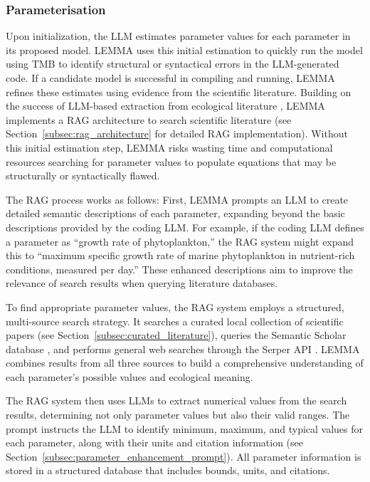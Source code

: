 \subsubsection{Parameterisation}
Upon initialization, the LLM estimates parameter values for each parameter in its proposed model. LEMMA uses this initial estimation to quickly run the model using TMB to identify structural or syntactical errors in the LLM-generated code. If a candidate model is successful in compiling and running, LEMMA refines these estimates using evidence from the scientific literature. Building on the success of LLM-based extraction from ecological literature \citep{keck2025extracting,spillias2024evaluating}, LEMMA implements a RAG architecture to search scientific literature (see Section~\ref{subsec:rag_architecture} for detailed RAG implementation). Without this initial estimation step, LEMMA risks wasting time and computational resources searching for parameter values to populate equations that may be structurally or syntactically flawed.

The RAG process works as follows: First, LEMMA prompts an LLM to create detailed semantic descriptions of each parameter, expanding beyond the basic descriptions provided by the coding LLM. For example, if the coding LLM defines a parameter as ``growth rate of phytoplankton,'' the RAG system might expand this to ``maximum specific growth rate of marine phytoplankton in nutrient-rich conditions, measured per day.'' These enhanced descriptions aim to improve the relevance of search results when querying literature databases.

To find appropriate parameter values, the RAG system employs a structured, multi-source search strategy. It searches a curated local collection of scientific papers (see Section~\ref{subsec:curated_literature}), queries the Semantic Scholar database \citep{semantic_scholar_api}, and performs general web searches through the Serper API \citep{serper_api}. LEMMA combines results from all three sources to build a comprehensive understanding of each parameter's possible values and ecological meaning.

The RAG system then uses LLMs to extract numerical values from the search results, determining not only parameter values but also their valid ranges. The prompt instructs the LLM to identify minimum, maximum, and typical values for each parameter, along with their units and citation information (see Section~\ref{subsec:parameter_enhancement_prompt}). All parameter information is stored in a structured database that includes bounds, units, and citations. 

